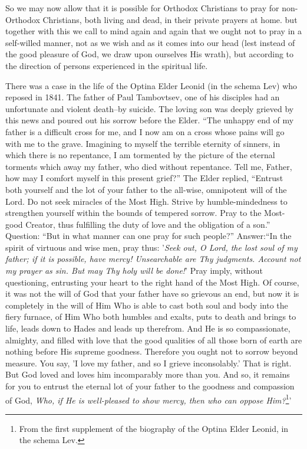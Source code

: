 So we may now allow that it is possible for Orthodox Christians to pray for non-Orthodox Christians, both living and dead, in their private prayers at home. but together with this we call to mind again and again that we ought not to pray in a self-willed manner, not as we wish and as it comes into our head (lest instead of the good pleasure of God, we draw upon ourselves His wrath), but according to the direction of persons experienced in the spiritual life.

There was a case in the life of the Optina Elder Leonid (in the schema Lev) who reposed in 1841. The father of Paul Tambovtsev, one of his disciples had an unfortunate and violent death--by suicide. The loving son was deeply grieved by this news and poured out his sorrow before the Elder. ``The unhappy end of my father is a difficult cross for me, and I now am on a cross whose pains will go with me to the grave. Imagining to myself the terrible eternity of sinners, in which there is no repentance, I am tormented by the picture of the eternal torments which away my father, who died without repentance. Tell me, Father, how may I comfort myself in this present grief?'' The Elder replied, ``Entrust both yourself and the lot of your father to the all-wise, omnipotent will of the Lord. Do not seek miracles of the Most High. Strive by humble-mindedness to strengthen yourself within the bounds of tempered sorrow. Pray to the Most-good Creator, thus fulfilling the duty of love and the obligation of a son.'' Question: ``But in what manner can one pray for such people?'' Answer:``In the spirit of virtuous and wise men, pray thus: '\textit{Seek out, O Lord, the lost soul of my father; if it is possible, have mercy! Unsearchable are Thy judgments. Account not my prayer as sin. But may Thy holy will be done!}' Pray imply, without questioning, entrusting your heart to the right hand of the Most High. Of course, it was not the will of God that your father have so grievous an end, but now it is completely in the will of Him Who is able to cast both soul and body into the fiery furnace, of Him Who both humbles and exalts, puts to death and brings to life, leads down to Hades and leads up therefrom. And He is so compassionate, almighty, and filled with love that the good qualities of all those born of earth are nothing before His supreme goodness. Therefore you ought not to sorrow beyond measure. You say, 'I love my father, and so I grieve inconsolably.' That is right. But God loved and loves him incomparably more than you. And so, it remains for you to entrust the eternal lot of your father to the goodness and compassion of God, \textit{Who, if He is well-pleased to show mercy, then who can oppose Him?}\footnote{From the first supplement of the biography of the Optina Elder Leonid, in the schema Lev.}'

